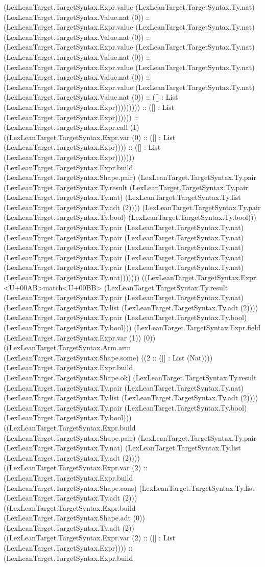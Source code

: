 \documentclass[11pt]{article}
\begin{document}
(LexLeanTarget.TargetSyntax.Expr.value (LexLeanTarget.TargetSyntax.Ty.nat) (LexLeanTarget.TargetSyntax.Value.nat (0)) :: (LexLeanTarget.TargetSyntax.Expr.value (LexLeanTarget.TargetSyntax.Ty.nat) (LexLeanTarget.TargetSyntax.Value.nat (0)) :: (LexLeanTarget.TargetSyntax.Expr.value (LexLeanTarget.TargetSyntax.Ty.nat) (LexLeanTarget.TargetSyntax.Value.nat (0)) :: (LexLeanTarget.TargetSyntax.Expr.value (LexLeanTarget.TargetSyntax.Ty.nat) (LexLeanTarget.TargetSyntax.Value.nat (0)) :: (LexLeanTarget.TargetSyntax.Expr.value (LexLeanTarget.TargetSyntax.Ty.nat) (LexLeanTarget.TargetSyntax.Value.nat (0)) :: ([] : List (LexLeanTarget.TargetSyntax.Expr))))))))) :: ([] : List (LexLeanTarget.TargetSyntax.Expr)))))) :: (LexLeanTarget.TargetSyntax.Expr.call (1) ((LexLeanTarget.TargetSyntax.Expr.var (0) :: ([] : List (LexLeanTarget.TargetSyntax.Expr)))) :: ([] : List (LexLeanTarget.TargetSyntax.Expr))))))) (LexLeanTarget.TargetSyntax.Expr.build (LexLeanTarget.TargetSyntax.Shape.pair) (LexLeanTarget.TargetSyntax.Ty.pair (LexLeanTarget.TargetSyntax.Ty.result (LexLeanTarget.TargetSyntax.Ty.pair (LexLeanTarget.TargetSyntax.Ty.nat) (LexLeanTarget.TargetSyntax.Ty.list (LexLeanTarget.TargetSyntax.Ty.adt (2)))) (LexLeanTarget.TargetSyntax.Ty.pair (LexLeanTarget.TargetSyntax.Ty.bool) (LexLeanTarget.TargetSyntax.Ty.bool))) (LexLeanTarget.TargetSyntax.Ty.pair (LexLeanTarget.TargetSyntax.Ty.nat) (LexLeanTarget.TargetSyntax.Ty.pair (LexLeanTarget.TargetSyntax.Ty.nat) (LexLeanTarget.TargetSyntax.Ty.pair (LexLeanTarget.TargetSyntax.Ty.nat) (LexLeanTarget.TargetSyntax.Ty.pair (LexLeanTarget.TargetSyntax.Ty.nat) (LexLeanTarget.TargetSyntax.Ty.pair (LexLeanTarget.TargetSyntax.Ty.nat) (LexLeanTarget.TargetSyntax.Ty.nat))))))) ((LexLeanTarget.TargetSyntax.Expr.<U+00AB>match<U+00BB> (LexLeanTarget.TargetSyntax.Ty.result (LexLeanTarget.TargetSyntax.Ty.pair (LexLeanTarget.TargetSyntax.Ty.nat) (LexLeanTarget.TargetSyntax.Ty.list (LexLeanTarget.TargetSyntax.Ty.adt (2)))) (LexLeanTarget.TargetSyntax.Ty.pair (LexLeanTarget.TargetSyntax.Ty.bool) (LexLeanTarget.TargetSyntax.Ty.bool))) (LexLeanTarget.TargetSyntax.Expr.field (LexLeanTarget.TargetSyntax.Expr.var (1)) (0)) ((LexLeanTarget.TargetSyntax.Arm.arm (LexLeanTarget.TargetSyntax.Shape.some) ((2 :: ([] : List (Nat)))) (LexLeanTarget.TargetSyntax.Expr.build (LexLeanTarget.TargetSyntax.Shape.ok) (LexLeanTarget.TargetSyntax.Ty.result (LexLeanTarget.TargetSyntax.Ty.pair (LexLeanTarget.TargetSyntax.Ty.nat) (LexLeanTarget.TargetSyntax.Ty.list (LexLeanTarget.TargetSyntax.Ty.adt (2)))) (LexLeanTarget.TargetSyntax.Ty.pair (LexLeanTarget.TargetSyntax.Ty.bool) (LexLeanTarget.TargetSyntax.Ty.bool))) ((LexLeanTarget.TargetSyntax.Expr.build (LexLeanTarget.TargetSyntax.Shape.pair) (LexLeanTarget.TargetSyntax.Ty.pair (LexLeanTarget.TargetSyntax.Ty.nat) (LexLeanTarget.TargetSyntax.Ty.list (LexLeanTarget.TargetSyntax.Ty.adt (2)))) ((LexLeanTarget.TargetSyntax.Expr.var (2) :: (LexLeanTarget.TargetSyntax.Expr.build (LexLeanTarget.TargetSyntax.Shape.cons) (LexLeanTarget.TargetSyntax.Ty.list (LexLeanTarget.TargetSyntax.Ty.adt (2))) ((LexLeanTarget.TargetSyntax.Expr.build (LexLeanTarget.TargetSyntax.Shape.adt (0)) (LexLeanTarget.TargetSyntax.Ty.adt (2)) ((LexLeanTarget.TargetSyntax.Expr.var (2) :: ([] : List (LexLeanTarget.TargetSyntax.Expr)))) :: (LexLeanTarget.TargetSyntax.Expr.build 
\end{document}

